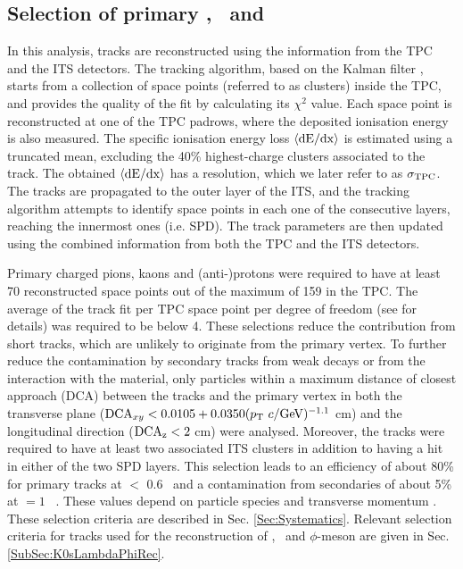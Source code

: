 \subsection{Selection of primary \pion, \kaon~and \proton}
\label{SubSec:Track}
In this analysis, tracks are reconstructed using the information from the TPC and the ITS detectors. The tracking algorithm, based on the Kalman filter \cite{Billoir:1983mz,Billoir:1985nq}, starts from a collection of space points (referred to as clusters) inside the TPC, and provides the quality of the fit by calculating its $\chi^{2}$ value. Each space point is reconstructed at one of the TPC padrows, where the deposited ionisation energy is also measured. The specific ionisation energy loss $\langle{\rm{dE}/dx}\rangle$ is estimated using a truncated mean, excluding the 40\% highest-charge clusters associated to the track. The obtained $\langle{\rm{dE}/dx}\rangle$ has a resolution, which we later refer to as $\sigma_{\rm{TPC}}$. The tracks are propagated to the outer layer of the ITS, and the tracking algorithm attempts to identify space points in each one of the consecutive layers, reaching the innermost ones (i.e. SPD). The track parameters are then updated using the combined information from both the TPC and the ITS detectors. 

Primary charged pions, kaons and (anti-)protons were required to have at least 70 reconstructed space points out of the maximum of 159 in the TPC. The average of the track fit per TPC space point per degree of freedom (see \cite{Abelev:2014ffa} for details) was required to be below 4. These selections reduce the contribution from short tracks, which are unlikely to originate from the primary vertex. To further reduce the contamination by secondary tracks from weak decays or from the interaction with the material, only particles within a maximum distance of closest approach (DCA) between the tracks and the primary vertex in both the transverse plane (${\rm{DCA}}_{xy} < 0.0105 + 0.0350(p_{\rm{T}}~c/{\rm{GeV}})^{-1.1}$ cm) and the longitudinal direction ($\rm{DCA}_{z} < 2$ cm) were analysed. Moreover, the tracks were required to have at least two associated ITS clusters in addition to having a hit in either of the two SPD layers. This selection leads to an efficiency of about 80\% for primary tracks at \pT$ < $ 0.6 \GeV~and a contamination from secondaries of about 5\% at \pT $= 1$ \GeV~\cite{Abelev:2013vea}. These values depend on particle species and transverse momentum \cite{Abelev:2013vea}. These selection criteria are described in Sec. \ref{Sec:Systematics}. Relevant selection criteria for tracks used for the reconstruction of \Ks, \lambdas~and $\phi$-meson are given in Sec. \ref{SubSec:K0sLambdaPhiRec}.

